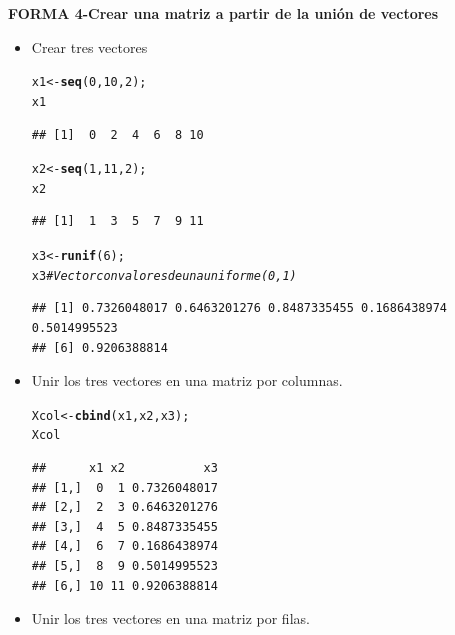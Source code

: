 \documentclass[12pt,letterpaper]{article}\usepackage[]{graphicx}\usepackage[]{color}
\makeatletter
\newcommand{\hlnum}[1]{\textcolor[rgb]{0.686,0.059,0.569}{#1}}%
\newcommand{\hlcom}[1]{\textcolor[rgb]{0.678,0.584,0.686}{\textit{#1}}}%
\newcommand{\hlstd}[1]{\textcolor[rgb]{0.345,0.345,0.345}{#1}}%
\newcommand{\hlkwb}[1]{\textcolor[rgb]{0.69,0.353,0.396}{#1}}%
\newcommand{\hlkwd}[1]{\textcolor[rgb]{0.737,0.353,0.396}{\textbf{#1}}}%
\newenvironment{kframe}{%
 \def\at@end@of@kframe{}%
 \ifinner\ifhmode%
  \def\at@end@of@kframe{\end{minipage}}%
  \begin{minipage}{\columnwidth}%
 \fi\fi%
 \def\FrameCommand##1{\hskip\@totalleftmargin \hskip-\fboxsep
 \colorbox{shadecolor}{##1}\hskip-\fboxsep
     \hskip-\linewidth \hskip-\@totalleftmargin \hskip\columnwidth}%
 \MakeFramed {\advance\hsize-\width
   \@totalleftmargin\z@ \linewidth\hsize
   \@setminipage}}%
 {\par\unskip\endMakeFramed%
 \at@end@of@kframe}
\newenvironment{knitrout}{}{} %
\makeatother
\begin{document}
\textbf {FORMA 4-Crear una matriz a partir de la uni\'on de vectores}
\begin{itemize}
\item Crear tres vectores
\begin{knitrout}
\color{fgcolor}\begin{kframe}
\begin{alltt}
\hlstd{x1} \hlkwb{<-} \hlkwd{seq}\hlstd{(}\hlnum{0}\hlstd{,} \hlnum{10}\hlstd{,} \hlnum{2}\hlstd{);}
\hlstd{x1}
\end{alltt}
\begin{verbatim}
## [1]  0  2  4  6  8 10
\end{verbatim}
\begin{alltt}
\hlstd{x2} \hlkwb{<-} \hlkwd{seq}\hlstd{(}\hlnum{1}\hlstd{,} \hlnum{11}\hlstd{,} \hlnum{2}\hlstd{);}
\hlstd{x2}
\end{alltt}
\begin{verbatim}
## [1]  1  3  5  7  9 11
\end{verbatim}
\begin{alltt}
\hlstd{x3} \hlkwb{<-} \hlkwd{runif}\hlstd{(}\hlnum{6}\hlstd{);}
\hlstd{x3} \hlcom{# Vector con valores de una uniforme(0,1)}
\end{alltt}
\begin{verbatim}
## [1] 0.7326048017 0.6463201276 0.8487335455 0.1686438974 0.5014995523
## [6] 0.9206388814
\end{verbatim}
\end{kframe}
\end{knitrout}
\item Unir los tres vectores en una matriz por columnas.
\begin{knitrout}
\color{fgcolor}\begin{kframe}
\begin{alltt}
\hlstd{Xcol} \hlkwb{<-} \hlkwd{cbind}\hlstd{(x1, x2, x3);}
\hlstd{Xcol}
\end{alltt}
\begin{verbatim}
##      x1 x2           x3
## [1,]  0  1 0.7326048017
## [2,]  2  3 0.6463201276
## [3,]  4  5 0.8487335455
## [4,]  6  7 0.1686438974
## [5,]  8  9 0.5014995523
## [6,] 10 11 0.9206388814
\end{verbatim}
\end{kframe}
\end{knitrout}
\item Unir los tres vectores en una matriz por filas.
\begin{knitrout}

\end{knitrout}
\end{itemize}
\end{document}
